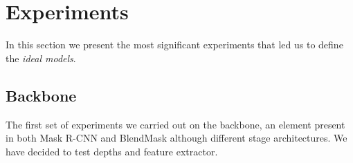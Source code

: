 \documentclass[10pt,twocolumn,letterpaper]{article}
\begin{document}
\section{Experiments}
\label{sec:experiments}
In this section we present the most significant experiments that led us to define the \textit{ideal models}.


\subsection{Backbone}
\label{experiments:second_trial}
The first set of experiments we carried out on the backbone, an element present in both Mask R-CNN and BlendMask although different stage architectures.
We have decided to test depths and feature extractor.
\end{document}
